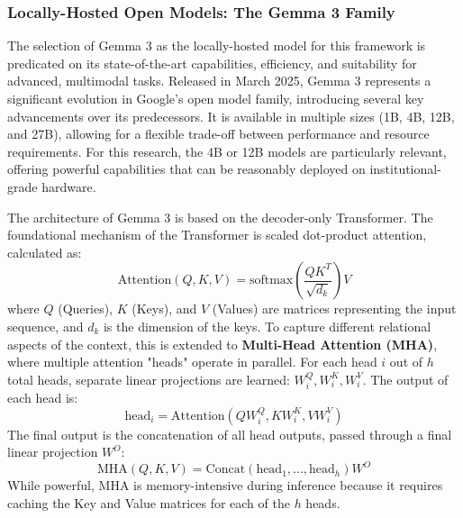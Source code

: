 \subsubsection{Locally-Hosted Open Models: The Gemma 3 Family}

The selection of Gemma 3 as the locally-hosted model for this framework is predicated on its state-of-the-art capabilities, efficiency, and suitability for advanced, multimodal tasks. Released in March 2025, Gemma 3 represents a significant evolution in Google's open model family, introducing several key advancements over its predecessors. It is available in multiple sizes (1B, 4B, 12B, and 27B), allowing for a flexible trade-off between performance and resource requirements. For this research, the 4B or 12B models are particularly relevant, offering powerful capabilities that can be reasonably deployed on institutional-grade hardware.

The architecture of Gemma 3 is based on the decoder-only Transformer. The foundational mechanism of the Transformer is scaled dot-product attention, calculated as:
$$ \text{Attention}(Q, K, V) = \text{softmax}\left(\frac{QK^T}{\sqrt{d_k}}\right)V $$
where $Q$ (Queries), $K$ (Keys), and $V$ (Values) are matrices representing the input sequence, and $d_k$ is the dimension of the keys. To capture different relational aspects of the context, this is extended to \textbf{Multi-Head Attention (MHA)}, where multiple attention "heads" operate in parallel. For each head $i$ out of $h$ total heads, separate linear projections are learned: $W_i^Q, W_i^K, W_i^V$. The output of each head is:
$$ \text{head}_i = \text{Attention}(QW_i^Q, KW_i^K, VW_i^V) $$
The final output is the concatenation of all head outputs, passed through a final linear projection $W^O$:
$$ \text{MHA}(Q, K, V) = \text{Concat}(\text{head}_1, ..., \text{head}_h)W^O $$
While powerful, MHA is memory-intensive during inference because it requires caching the Key and Value matrices for each of the $h$ heads.

